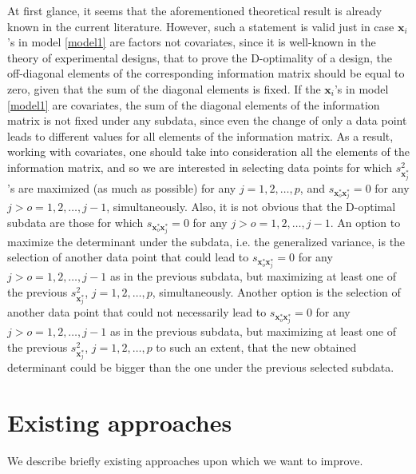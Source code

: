 \documentclass[12pt]{article}
\theoremstyle{definition}
\begin{document}
	At first glance, it seems that the aforementioned theoretical result is already known in the current literature. However, such a statement is valid just in case $\textbf{x}_i$'s in model \eqref{model1} are factors not covariates, since it is well-known in the theory of experimental designs, that to prove the D-optimality of a design, the off-diagonal elements of the corresponding information matrix should be equal to zero, given that the sum of the diagonal elements is fixed. If the $\textbf{x}_i$'s in model \eqref{model1} are covariates, the sum of the diagonal elements of the information matrix is not fixed under any subdata, since even the change of only a data point leads to different values for all elements of the information matrix. As a result, working with covariates, one should take into consideration all the elements of the information matrix, and so we are interested in selecting data points for which $s_{\textbf{x}_j^*}^2$'s are maximized (as much as possible) for any $j=1,2,\ldots,p$, and $s_{\textbf{x}_o^*\textbf{x}_j^*}=0$ for any $j>o=1,2,\ldots,j-1$, simultaneously. Also, it is not obvious that the D-optimal subdata are those for which $s_{\textbf{x}_o^*\textbf{x}_j^*}=0$ for any $j>o=1,2,\ldots,j-1$. An option to maximize the determinant under the subdata, i.e. the generalized variance, is the selection of another data point that could lead to $s_{\textbf{x}_o^*\textbf{x}_j^*}=0$ for any $j>o=1,2,\ldots,j-1$ as in the previous subdata, but maximizing at least one of the previous $s_{\textbf{x}_j^*}^2$, $j=1,2,\ldots,p$, simultaneously. Another option is the selection of another data point that could not necessarily lead to $s_{\textbf{x}_o^*\textbf{x}_j^*}=0$ for any $j>o=1,2,\ldots,j-1$ as in the previous subdata, but maximizing at least one of the previous $s_{\textbf{x}_j^*}^2$, $j=1,2,\ldots,p$ to such an extent, that the new obtained determinant could be bigger than the one under the previous selected subdata.
	
	
	\section{Existing approaches}
	\label{back} 
	We describe briefly existing approaches upon which we want to improve. 
\end{document}
